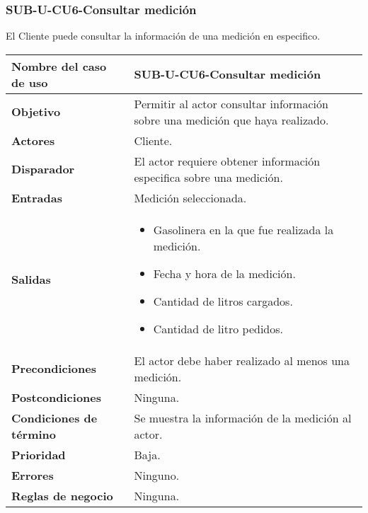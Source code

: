 \subsubsection{SUB-U-CU6-Consultar medición}\label{SUB-U-CU6}
El Cliente puede consultar la información de una medición en especifico.

\begin{longtable}{|J{5cm}|J{10.3cm}|}
	\hline
	\textbf{Nombre del caso de uso} &
		SUB-U-CU6-Consultar medición \\ \hline
	\textbf{Objetivo} &
		Permitir al actor consultar información sobre una medición que haya realizado. \\ \hline
	\textbf{Actores} &
		Cliente. \\ \hline 
	\textbf{Disparador} & 
		El actor requiere obtener información especifica sobre una medición.\\ \hline 
	\textbf{Entradas} & Medición seleccionada.
		\\ \hline 
	\textbf{Salidas} & 
		\begin{itemize}
			\item Gasolinera en la que fue realizada la medición.
			\item Fecha y hora de la medición.
			\item Cantidad de litros cargados.
			\item Cantidad de litro pedidos.
		\end{itemize} 
		\\ \hline
	\textbf{Precondiciones} &
		El actor debe haber realizado al menos una medición.\\ \hline
	\textbf{Postcondiciones} & Ninguna.
		\\ \hline
	\textbf{Condiciones de término} & Se muestra la información de la medición al actor.
		\\ \hline 
	\textbf{Prioridad} & 
		Baja. \\ \hline
	\textbf{Errores} & Ninguno.
		\\ \hline
	\textbf{Reglas de negocio} & Ninguna.
		 \\ \hline
\end{longtable}

